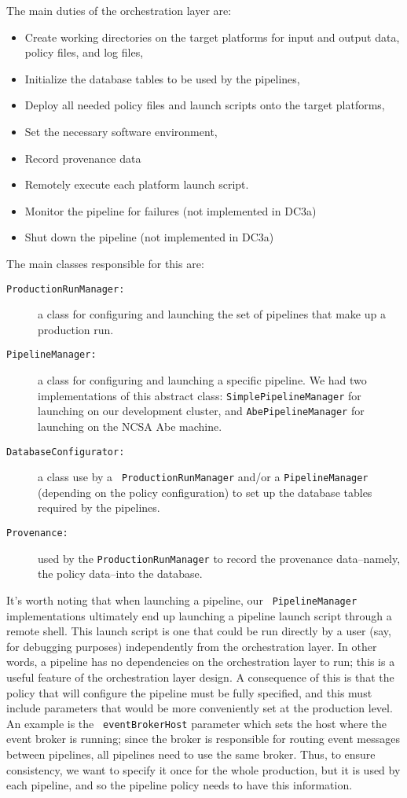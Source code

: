 The main duties of the orchestration layer are:
\begin{itemize}
\item Create working directories on the target platforms for input and
  output data, policy files, and log files,
\item Initialize the database tables to be used by the pipelines, 
\item Deploy all needed policy files and launch scripts onto the
  target platforms,
\item Set the necessary software environment, 
\item Record provenance data
\item Remotely execute each platform launch script.
\item Monitor the pipeline for failures (not implemented in DC3a)
\item Shut down the pipeline (not implemented in DC3a)
\end{itemize}

The main classes responsible for this are:

\begin{description}
\item[\tt ProductionRunManager:]  a class for configuring and launching the
set of pipelines that make up a production run.  
\item[\tt PipelineManager:]  a class for configuring and launching a
specific pipeline.  We had two implementations of this abstract class:
{\tt SimplePipelineManager} for launching on our development cluster,
and {\tt AbePipelineManager} for launching on the NCSA Abe machine.  
\item[\tt DatabaseConfigurator:]  a class use by a {\tt
ProductionRunManager} and/or a {\tt PipelineManager} (depending on the
policy configuration) to set up the database tables required by the
pipelines.  
\item[\tt Provenance:]  used by the {\tt ProductionRunManager} to
record the provenance data--namely, the policy data--into the
database.  
\end{description}

It's worth noting that when launching a pipeline, our {\tt
PipelineManager} implementations ultimately end up launching a
pipeline launch script through a remote shell.   This launch script is
one that could be run directly by a user (say, for debugging purposes)
independently from the orchestration layer.  In other words, a
pipeline has no dependencies on the orchestration layer to run; this
is a useful feature of the orchestration layer design.  A consequence
of this is that the policy that will configure the pipeline must be
fully specified, and this must include parameters that would be more
conveniently set at the production level.  An example is the {\tt
eventBrokerHost} parameter which sets the host where the event broker
is running; since the broker is responsible for routing event messages
between pipelines, all pipelines need to use the same broker.  Thus,
to ensure consistency, we want to specify it once for the whole
production, but it is used by each pipeline, and so the pipeline
policy needs to have this information.  

